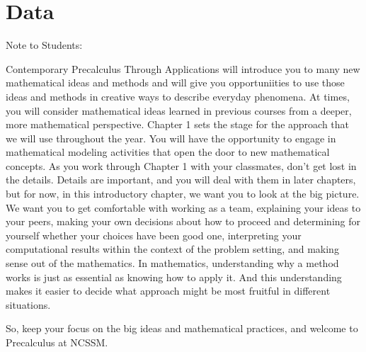 \documentclass[10pt,]{book}
\theoremstyle{ptxdefinitionnotitle}
\theoremstyle{ptxdefinitiontitle}
\numberwithin{equation}{section}
\begin{document}
\chapter[{Data}]{Data}\label{chapter01}
\hypertarget{p-1}{}%
Note to Students:%
\par
\hypertarget{p-2}{}%
Contemporary Precalculus Through Applications will introduce you to many new mathematical ideas and methods and will give you opportuniities to use those ideas and methods in creative ways to describe everyday phenomena.  At times, you will consider mathematical ideas learned in previous courses from a deeper, more mathematical perspective.  Chapter 1 sets the stage for the approach that we will use throughout the year.  You will have the opportunity to engage in mathematical modeling activities that open the door to new mathematical concepts.   As you work through Chapter 1 with your classmates, don’t get lost in the details.  Details are important, and you will deal with them in later chapters, but for now, in this introductory chapter, we want you to look at the big picture.  We want you to get comfortable with working as a team, explaining your ideas to your peers, making your own decisions about how to proceed and determining for yourself whether your choices have been good one, interpreting your computational results within the context of the problem setting, and making sense out of the mathematics.  In mathematics, understanding why a method works is just as essential as knowing how to apply it.   And this understanding makes it easier to decide what approach might be most fruitful in different situations.%
\par
\hypertarget{p-3}{}%
So, keep your focus on the big ideas and mathematical practices, and welcome to Precalculus at NCSSM.%
\typeout{************************************************}
\typeout{************************************************}
\end{document}

